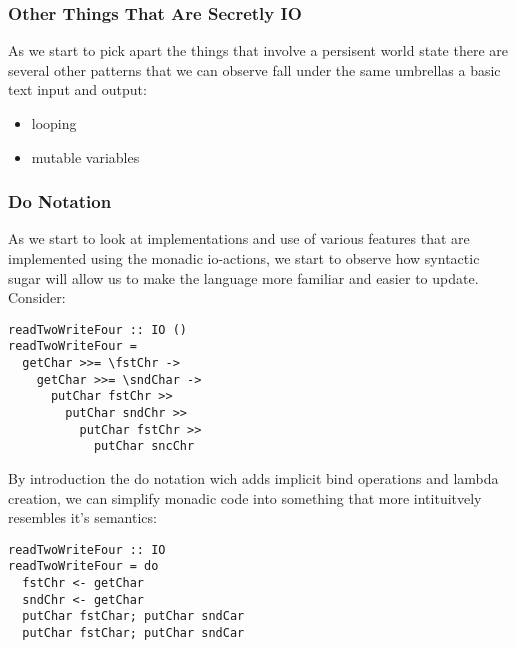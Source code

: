 \documentclass{beamer}
\begin{document}
\begin{frame}
  \frametitle{Other Things That Are Secretly IO}
  As we start to pick apart the things that involve a persisent world
  state there are several other patterns that we can observe fall
  under the same umbrellas a basic text input and output:
  \begin{itemize}
  \item looping
  \item mutable variables
  \end{itemize}
\end{frame}

\begin{frame}[fragile]
  \frametitle{Do Notation}
  As we start to look at implementations and use of various features
  that are implemented using the monadic io-actions, we start to
  observe how syntactic sugar will allow us to make the language more
  familiar and easier to update.  Consider:
\begin{lstlisting}
readTwoWriteFour :: IO ()
readTwoWriteFour =
  getChar >>= \fstChr ->
    getChar >>= \sndChar ->
      putChar fstChr >>
        putChar sndChr >>
          putChar fstChr >>
            putChar sncChr
\end{lstlisting}
\end{frame}

\begin{frame}[fragile]
  By introduction the do notation wich adds implicit bind operations
  and lambda creation, we can simplify monadic code into something
  that more intituitvely resembles it's semantics:
\begin{lstlisting}
readTwoWriteFour :: IO
readTwoWriteFour = do
  fstChr <- getChar
  sndChr <- getChar
  putChar fstChar; putChar sndCar
  putChar fstChar; putChar sndCar
\end{lstlisting}
\end{frame}
\end{document}
